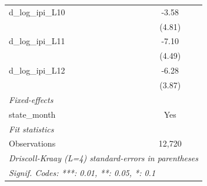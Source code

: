 \begin{tabular}{lc}
   d\_log\_ipi\_L10        & -3.58\\   
                           & (4.81)\\   
   d\_log\_ipi\_L11        & -7.10\\   
                           & (4.49)\\   
   d\_log\_ipi\_L12        & -6.28\\   
                           & (3.87)\\   
   \midrule
   \emph{Fixed-effects}\\
   state\_month            & Yes\\  
   \midrule
   \emph{Fit statistics}\\
   Observations            & 12,720\\  
   \midrule \midrule
   \multicolumn{2}{l}{\emph{Driscoll-Kraay (L=4) standard-errors in parentheses}}\\
   \multicolumn{2}{l}{\emph{Signif. Codes: ***: 0.01, **: 0.05, *: 0.1}}\\
\end{tabular}
\par\endgroup


